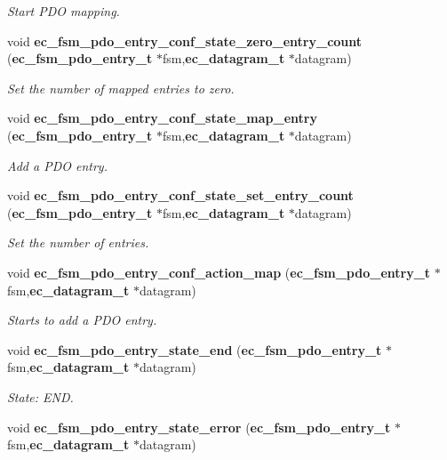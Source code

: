 \begin{DoxyCompactItemize}
\begin{DoxyCompactList}\small\item\em \-Start \-P\-D\-O mapping. \end{DoxyCompactList}\item 
void {\bf ec\-\_\-fsm\-\_\-pdo\-\_\-entry\-\_\-conf\-\_\-state\-\_\-zero\-\_\-entry\-\_\-count} ({\bf ec\-\_\-fsm\-\_\-pdo\-\_\-entry\-\_\-t} $\ast$fsm,{\bf ec\-\_\-datagram\-\_\-t} $\ast$datagram)
\begin{DoxyCompactList}\small\item\em \-Set the number of mapped entries to zero. \end{DoxyCompactList}\item 
void {\bf ec\-\_\-fsm\-\_\-pdo\-\_\-entry\-\_\-conf\-\_\-state\-\_\-map\-\_\-entry} ({\bf ec\-\_\-fsm\-\_\-pdo\-\_\-entry\-\_\-t} $\ast$fsm,{\bf ec\-\_\-datagram\-\_\-t} $\ast$datagram)
\begin{DoxyCompactList}\small\item\em \-Add a \-P\-D\-O entry. \end{DoxyCompactList}\item 
void {\bf ec\-\_\-fsm\-\_\-pdo\-\_\-entry\-\_\-conf\-\_\-state\-\_\-set\-\_\-entry\-\_\-count} ({\bf ec\-\_\-fsm\-\_\-pdo\-\_\-entry\-\_\-t} $\ast$fsm,{\bf ec\-\_\-datagram\-\_\-t} $\ast$datagram)
\begin{DoxyCompactList}\small\item\em \-Set the number of entries. \end{DoxyCompactList}\item 
void {\bf ec\-\_\-fsm\-\_\-pdo\-\_\-entry\-\_\-conf\-\_\-action\-\_\-map} ({\bf ec\-\_\-fsm\-\_\-pdo\-\_\-entry\-\_\-t} $\ast$fsm,{\bf ec\-\_\-datagram\-\_\-t} $\ast$datagram)
\begin{DoxyCompactList}\small\item\em \-Starts to add a \-P\-D\-O entry. \end{DoxyCompactList}\item 
void {\bf ec\-\_\-fsm\-\_\-pdo\-\_\-entry\-\_\-state\-\_\-end} ({\bf ec\-\_\-fsm\-\_\-pdo\-\_\-entry\-\_\-t} $\ast$fsm,{\bf ec\-\_\-datagram\-\_\-t} $\ast$datagram)
\begin{DoxyCompactList}\small\item\em \-State\-: \-E\-N\-D. \end{DoxyCompactList}\item 
void {\bf ec\-\_\-fsm\-\_\-pdo\-\_\-entry\-\_\-state\-\_\-error} ({\bf ec\-\_\-fsm\-\_\-pdo\-\_\-entry\-\_\-t} $\ast$fsm,{\bf ec\-\_\-datagram\-\_\-t} $\ast$datagram)

\end{DoxyCompactItemize}
